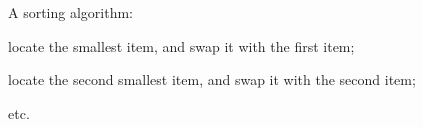  A sorting algorithm:
\par
locate the smallest item, and swap it with the first item;
\par
locate the second smallest item, and swap it with the
second item;
\par
etc. 